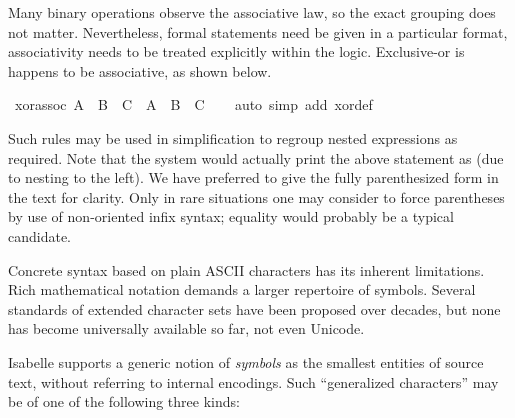 \begin{isabellebody}
\begin{isamarkuptext}
  Many binary operations observe the associative law, so the exact
  grouping does not matter.  Nevertheless, formal statements need be
  given in a particular format, associativity needs to be treated
  explicitly within the logic.  Exclusive-or is happens to be
  associative, as shown below.%
\end{isamarkuptext}%
\isamarkuptrue%
\ xor{\isacharunderscore}assoc{\isacharcolon}\ {\isachardoublequote}{\isacharparenleft}A\ {\isacharbrackleft}{\isacharplus}{\isacharbrackright}\ B{\isacharparenright}\ {\isacharbrackleft}{\isacharplus}{\isacharbrackright}\ C\ {\isacharequal}\ A\ {\isacharbrackleft}{\isacharplus}{\isacharbrackright}\ {\isacharparenleft}B\ {\isacharbrackleft}{\isacharplus}{\isacharbrackright}\ C{\isacharparenright}{\isachardoublequote}\isanewline
\ \ \isamarkupfalse%
\ {\isacharparenleft}auto\ simp\ add{\isacharcolon}\ xor{\isacharunderscore}def{\isacharparenright}\isamarkupfalse%
%
\begin{isamarkuptext}%
Such rules may be used in simplification to regroup nested
  expressions as required.  Note that the system would actually print
  the above statement as 
  (due to nesting to the left).  We have preferred to give the fully
  parenthesized form in the text for clarity.  Only in rare situations
  one may consider to force parentheses by use of non-oriented infix
  syntax; equality would probably be a typical candidate.%
\end{isamarkuptext}%
\isamarkuptrue%
%
\isamarkuptrue%
%
\begin{isamarkuptext}%
Concrete syntax based on plain ASCII characters has its inherent
  limitations.  Rich mathematical notation demands a larger repertoire
  of symbols.  Several standards of extended character sets have been
  proposed over decades, but none has become universally available so
  far, not even Unicode.

  Isabelle supports a generic notion of
  \emph{symbols} as the smallest entities of
  source text, without referring to internal encodings.  Such
  ``generalized characters'' may be of one of the following three
  kinds:


\end{isamarkuptext}
\end{isabellebody}
